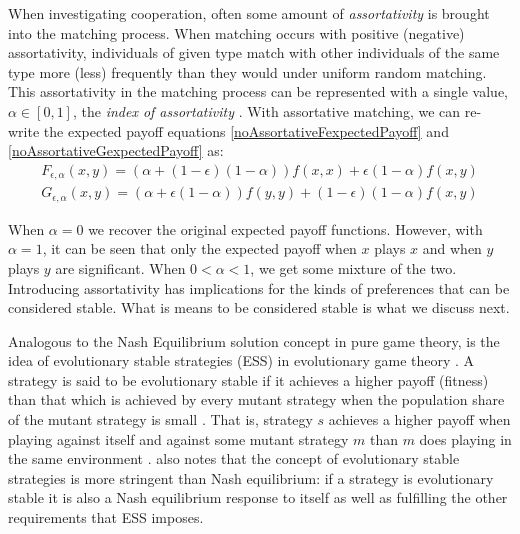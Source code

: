 \documentclass[11pt]{book}
\newcommand*{\np}{\par\noindent\newline}
\begin{document}
\np When investigating cooperation, often some amount of \textit{assortativity} is brought into the matching process.
When matching occurs with positive (negative) assortativity, individuals of given type match with other individuals of the same type more (less) frequently than they would under uniform random matching.
This assortativity in the matching process can be represented with a single value, $\alpha \in [0, 1]$, the \textit{index of assortativity} \citep{bergstrom_algebra_2003}.
With assortative matching, we can re-write the expected payoff equations \ref{noAssortativeFexpectedPayoff} and \ref{noAssortativeGexpectedPayoff} as:
\begin{gather}
	\label{assortativeFexpectedPayoff}
	F_{\epsilon, \alpha}(x, y) = (\alpha +(1-\epsilon)(1-\alpha))f(x, x) + \epsilon(1-\alpha)f(x, y)\\
	\label{assortativeGexpectedPayoff}
	G_{\epsilon, \alpha}(x, y) = (\alpha +\epsilon(1-\alpha))f(y, y) + (1-\epsilon)(1-\alpha)f(x, y)	
\end{gather}
\citet{alger_generalization_2012}

\np When $\alpha = 0$ we recover the original expected payoff functions.
However, with $\alpha = 1$, it can be seen that only the expected payoff when $x$ plays $x$ and when $y$ plays $y$ are significant.
When $0 < \alpha < 1$, we get some mixture of the two.
Introducing assortativity has implications for the kinds of preferences that can be considered stable.
What is means to be considered stable is what we discuss next.

\np Analogous to the Nash Equilibrium solution concept in pure game theory, is the idea of evolutionary stable
strategies (ESS) in evolutionary game theory \citep{smith_logic_1973}. A strategy is said to be evolutionary stable if it achieves a higher
payoff (fitness) than that which is achieved by every mutant strategy when the population share of the mutant strategy
is small \citep{weibull_introduction_1992}. That is, strategy $s$ achieves a higher payoff when playing against itself
and against some mutant strategy $m$ than $m$ does playing in the same environment \citep{shoham_multiagent_2008}. 
\citet{weibull_introduction_1992} also notes that the concept of evolutionary stable strategies is more stringent than Nash equilibrium: if a strategy is evolutionary stable it is also a Nash equilibrium response to itself
as well as fulfilling the other requirements that ESS imposes.
\end{document}
